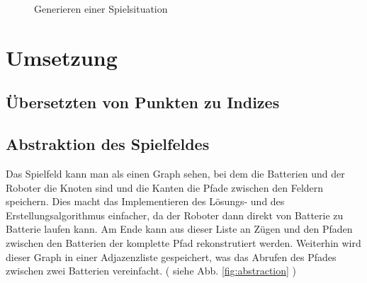 \documentclass[a4paper,10pt,ngerman]{scrartcl}
\newcommand{\abbref}[1]{
  siehe Abb. \ref{#1}
}
\begin{document}
\begin{figure}[ht]
\begin{subfigure} {0.25\textwidth}
  \end{subfigure}%
  \begin{subfigure} {0.25\textwidth}
    \centering
  \end{subfigure}%
  \caption{Generieren einer Spielsituation}
  \label{fig:generategame}
\end{figure}

\section{Umsetzung}

\subsection{Übersetzten von Punkten zu Indizes}


\subsection{Abstraktion des Spielfeldes}
Das Spielfeld kann man als einen Graph sehen, bei dem die Batterien und der Roboter die Knoten sind und die Kanten die Pfade zwischen den Feldern speichern.
Dies macht das Implementieren des Lösungs- und des Erstellungsalgorithmus einfacher, da der Roboter dann direkt von Batterie zu Batterie laufen kann.
Am Ende kann aus dieser Liste an Zügen und den Pfaden zwischen den Batterien der komplette Pfad rekonstrutiert werden.
Weiterhin wird dieser Graph in einer Adjazenzliste gespeichert, was das Abrufen des Pfades zwischen zwei Batterien vereinfacht.
(\abbref{fig:abstraction})
\end{document}

